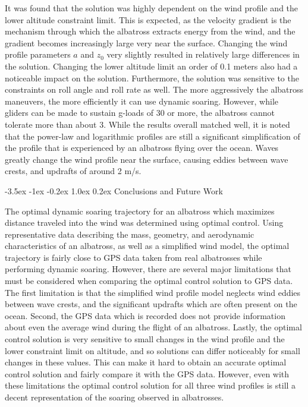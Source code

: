 \documentclass[11pt,letterpaper,onecolumn]{article}
\makeatletter
\renewcommand\section{\@startsection{section}{1}{\z@}%
{-3.5ex \@plus-1ex \@minus-0.2ex}%
{1.0ex \@plus0.2ex}%
{\fontsize{12pt}{12pt}\selectfont\bfseries\sffamily}}
\makeatother
\begin{document}
  It was found that the solution was highly dependent on the wind profile and the lower altitude constraint limit.
  This is expected, as the velocity gradient is the mechanism through which the albatross extracts energy from the wind, and the gradient becomes increasingly large very near the surface.
  Changing the wind profile parameters $a$ and $z_{0}$ very slightly resulted in relatively large differences in the solution.
  Changing the lower altitude limit an order of 0.1 meters also had a noticeable impact on the solution.
  Furthermore, the solution was sensitive to the constraints on roll angle and roll rate as well.
  The more aggressively the albatross maneuvers, the more efficiently it can use dynamic soaring.
  However, while gliders can be made to sustain g-loads of 30 or more, the albatross cannot tolerate more than about 3.
  While the results overall matched well, it is noted that the power-law and logarithmic profiles are still a significant simplification of the profile that is experienced by an albatross flying over the ocean.
  Waves greatly change the wind profile near the surface, causing eddies between wave crests, and updrafts of around 2 m/s.

  \section{Conclusions and Future Work}

  The optimal dynamic soaring trajectory for an albatross which maximizes distance traveled into the wind was determined using optimal control.
  Using representative data describing the mass, geometry, and aerodynamic characteristics of an albatross, as well as a simplified wind model, the optimal trajectory is fairly close to GPS data taken from real albatrosses while performing dynamic soaring.
  However, there are several major limitations that must be considered when comparing the optimal control solution to GPS data.
  The first limitation is that the simplified wind profile model neglects wind eddies between wave crests, and the significant updrafts which are often present on the ocean.
  Second, the GPS data which is recorded does not provide information about even the average wind during the flight of an albatross.
  Lastly, the optimal control solution is very sensitive to small changes in the wind profile and the lower constraint limit on altitude, and so solutions can differ noticeably for small changes in these values.
  This can make it hard to obtain an accurate optimal control solution and fairly compare it with the GPS data.
  However, even with these limitations the optimal control solution for all three wind profiles is still a decent representation of the soaring observed in albatrosses.
\end{document}
